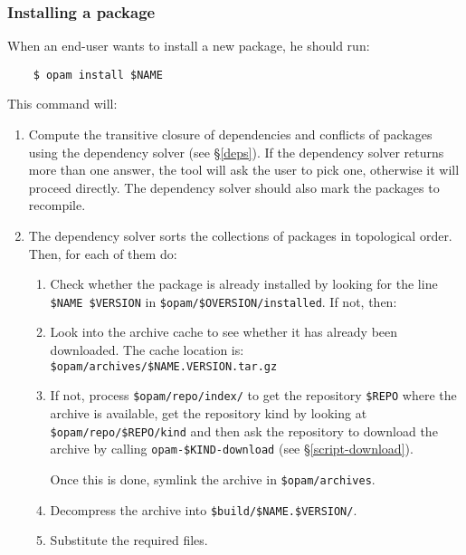 \documentclass[a4paper,11pt]{article}
\begin{document}
\subsubsection{Installing a package}
\label{opam-install}

When an end-user wants to install a new package, he should run:

\begin{verbatim}
    $ opam install $NAME
\end{verbatim}

This command will:

\begin{enumerate}

\item Compute the transitive closure of dependencies and conflicts of
  packages using the dependency solver (see \S\ref{deps}). If the
  dependency solver returns more than one answer, the tool will ask
  the user to pick one, otherwise it will proceed directly. The
  dependency solver should also mark the packages to recompile.

\item The dependency solver sorts the collections of packages in
  topological order. Then, for each of them do:

\begin{enumerate}

\item Check whether the package is already installed by looking for
  the line \verb+$NAME $VERSION+ in \verb+$opam/$OVERSION/installed+.
  If not, then:

\item Look into the archive cache to see whether it has already been
  downloaded. The cache location is:
  \verb+$opam/archives/$NAME.VERSION.tar.gz+

\item If not, process \verb+$opam/repo/index/+ to get the repository
  \verb+$REPO+ where the archive is available, get the repository kind
  by looking at \verb+$opam/repo/$REPO/kind+ and then ask the
  repository to download the archive by calling
  \verb+opam-$KIND-download+ (see \S\ref{script-download}).

  Once this is done, symlink the archive in \verb+$opam/archives+.

\item Decompress the archive into \verb+$build/$NAME.$VERSION/+.

\item Substitute the required files.


\end{enumerate}
\end{enumerate}
\end{document}
